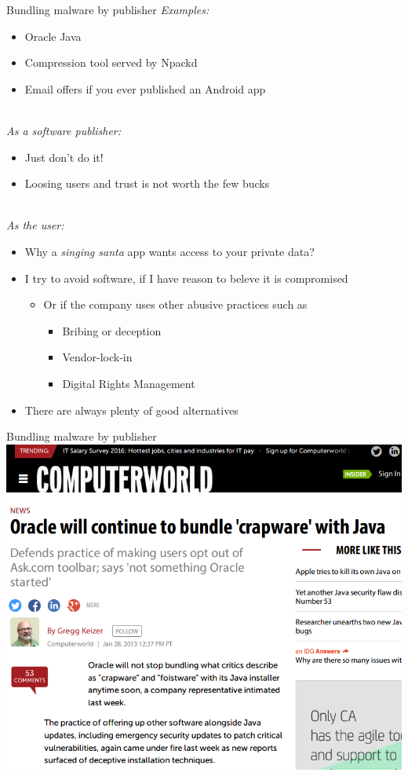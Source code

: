 \documentclass[11pt]{beamer}
\begin{document}
\begin{frame}{Bundling malware by publisher}
\emph{Examples:}
\begin{itemize}
\item Oracle Java
\item Compression tool served by Npackd %
\item Email offers if you ever published an Android app
\end{itemize}
\\[0.2cm]
\pause
\emph{As a software publisher:}
\begin{itemize}
\item Just don't do it!
\item Loosing users and trust is not worth the few bucks
\end{itemize}
\\[0.2cm]
\pause
\emph{As the user:}
\begin{itemize}
\item Why a \emph{singing santa} app wants access to your private data?
\item I try to avoid software, if I have reason to beleve it is compromised %
\begin{itemize}
\item Or if the company uses other abusive practices such as
\begin{itemize}
\item Bribing or deception
\item Vendor-lock-in
\item Digital Rights Management
\end{itemize}
\end{itemize}
\item There are always plenty of good alternatives
\end{itemize}
\end{frame}

\begin{frame}{Bundling malware by publisher}
\includegraphics[scale=0.3]{oracle.png}
\end{frame}
\end{document}
